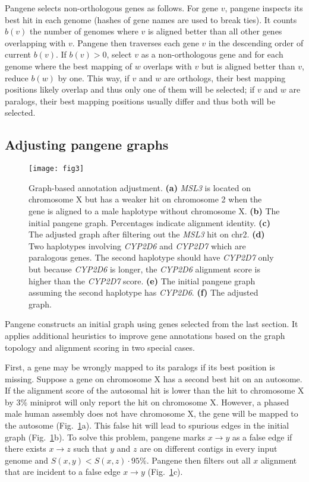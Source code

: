 \documentclass[webpdf,contemporary,large,namedate]{oup-authoring-template}%
\begin{document}
Pangene selects non-orthologous genes as follows.
For gene $v$, pangene inspects its best hit in each genome (hashes of gene names are used to break ties).
It counts $b(v)$ the number of genomes where $v$ is aligned better than all other genes overlapping with $v$.
Pangene then traverses each gene $v$ in the descending order of current $b(v)$.
If $b(v)>0$, select $v$ as a non-orthologous gene and for each genome where the best mapping of $w$ overlaps with $v$ but is aligned better than $v$, reduce $b(w)$ by one.
This way, if $v$ and $w$ are orthologs, their best mapping positions likely overlap and thus only one of them will be selected;
if $v$ and $w$ are paralogs, their best mapping positions usually differ and thus both will be selected.

\subsection{Adjusting pangene graphs}

\begin{figure}[t!]
\centering
\texttt{[image: fig3]}
\caption{Graph-based annotation adjustment.
{\bf (a)} \emph{MSL3} is located on chromosome X but has a weaker hit on chromosome 2 when the gene
is aligned to a male haplotype without chromosome X.
{\bf (b)} The initial pangene graph. Percentages indicate alignment identity.
{\bf (c)} The adjusted graph after filtering out the \emph{MSL3} hit on chr2.
{\bf (d)} Two haplotypes involving \emph{CYP2D6} and \emph{CYP2D7} which are paralogous genes.
The second haplotype should have \emph{CYP2D7} only but because \emph{CYP2D6} is longer, the \emph{CYP2D6} alignment score is higher than the \emph{CYP2D7} score.
{\bf (e)} The initial pangene graph assuming the second haplotype has \emph{CYP2D6}.
{\bf (f)} The adjusted graph.
}\label{fig:resolve}
\end{figure}

Pangene constructs an initial graph using genes selected from the last section.
It applies additional heuristics to improve gene annotations based on the graph topology and alignment scoring
in two special cases.

First, a gene may be wrongly mapped to its paralogs if its best position is missing.
Suppose a gene on chromosome X has a second best hit on an autosome.
If the alignment score of the autosomal hit is lower than the hit to chromosome X by 3\%
miniprot will only report the hit on chromosome X.
However, a phased male human assembly does not have chromosome X,
the gene will be mapped to the autosome (Fig.~\ref{fig:resolve}a).
This false hit will lead to spurious edges in the initial graph (Fig.~\ref{fig:resolve}b).
To solve this problem, pangene marks $x\to y$ as a false edge
if there exists $x\to z$ such that $y$ and $z$ are on different contigs in every input genome and $S(x,y)<S(x,z)\cdot 95\%$.
Pangene then filters out all $x$ alignment that are incident to a false edge $x\to y$ (Fig.~\ref{fig:resolve}c).
\end{document}
